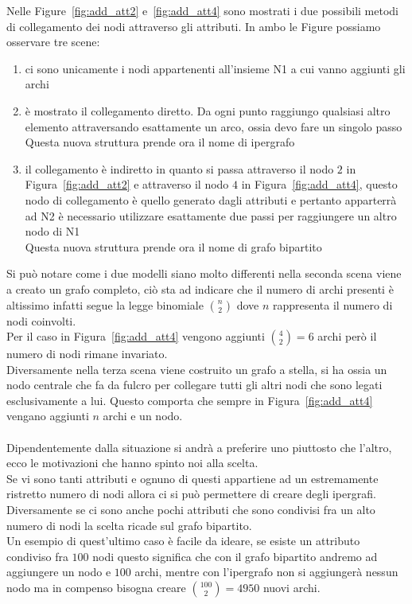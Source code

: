 %
Nelle Figure~\ref{fig:add_att2} e~\ref{fig:add_att4} sono mostrati i due possibili metodi di collegamento dei nodi attraverso gli attributi. In ambo le Figure possiamo osservare tre scene:
\begin{enumerate}
	\item ci sono unicamente i nodi appartenenti all'insieme N1 a cui vanno aggiunti gli archi
	\item è mostrato il collegamento diretto. Da ogni punto raggiungo qualsiasi altro elemento attraversando esattamente un arco, ossia devo fare un singolo passo\\
	Questa nuova struttura prende ora il nome di ipergrafo
	\item il collegamento è indiretto in quanto si passa attraverso il nodo $2$ in Figura~\ref{fig:add_att2} e attraverso il nodo $4$ in Figura~\ref{fig:add_att4}, questo nodo di collegamento è quello generato dagli attributi e pertanto apparterrà ad N2
	è necessario utilizzare esattamente due passi per raggiungere un altro nodo di N1\\
	Questa nuova struttura prende ora il nome di grafo bipartito
\end{enumerate}
%
Si può notare come i due modelli siano molto differenti nella seconda scena viene a creato un grafo completo, ciò sta ad indicare che il numero di archi presenti è altissimo infatti segue la legge binomiale $ \displaystyle\binom{n}{2}$ dove $n$ rappresenta il numero di nodi coinvolti.\\
Per il caso in Figura~\ref{fig:add_att4} vengono aggiunti $ \displaystyle\binom{4}{2} = 6$ archi però il numero di nodi rimane invariato.\\
Diversamente nella terza scena viene costruito un grafo a stella, si ha ossia un nodo centrale che fa da fulcro per collegare tutti gli altri nodi che sono legati esclusivamente a lui. Questo comporta che sempre in Figura~\ref{fig:add_att4} vengano aggiunti $n$ archi e un nodo.\\
\\
Dipendentemente dalla situazione si andrà a preferire uno piuttosto che l'altro, ecco le motivazioni che hanno spinto noi alla scelta.\\
Se vi sono tanti attributi e ognuno di questi appartiene ad un estremamente ristretto numero di nodi allora ci si può permettere di creare degli ipergrafi. Diversamente se ci sono anche pochi attributi che sono condivisi fra un alto numero di nodi la scelta ricade sul grafo bipartito.\\
Un esempio di quest'ultimo caso è facile da ideare, se esiste un attributo condiviso fra $100$ nodi questo significa che con il grafo bipartito andremo ad aggiungere un nodo e $100$ archi, mentre con l'ipergrafo non si aggiungerà nessun nodo ma in compenso bisogna creare $ \displaystyle\binom{100}{2} = 4950$ nuovi archi.\\
